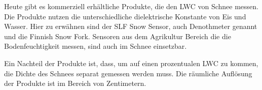 

Heute gibt es kommerziell erhältliche Produkte, die den LWC von Schnee messen. Die Produkte nutzen die unterschiedliche dielektrische Konstante von Eis und Wasser. Hier zu erwähnen sind der SLF Snow Sensor, auch Denothmeter genannt und die Finnish Snow Fork. Sensoren aus dem Agrikultur Bereich die die Bodenfeuchtigkeit messen, sind auch im Schnee einsetzbar.

Ein Nachteil der Produkte ist, dass, um auf einen prozentualen LWC zu kommen, die Dichte des Schnees separat gemessen werden muss. Die räumliche Auflösung der Produkte ist im Bereich von Zentimetern.
